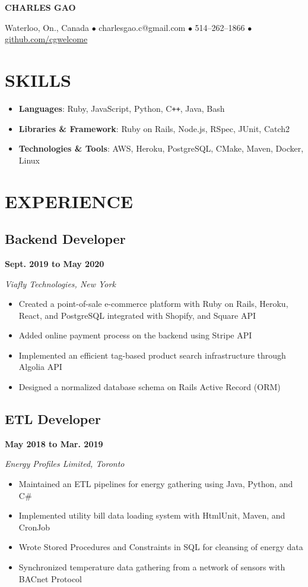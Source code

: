 \documentclass[12pt]{extarticle}
\begin{document}
\begin{center}
\textbf{\huge{CHARLES GAO}}

Waterloo, On., Canada
$\bullet$ charlesgao.c@gmail.com
$\bullet$ 514--262--1866
$\bullet$ \href{https://github.com/cgwelcome}{github.com/cgwelcome}
\end{center}

\section*{SKILLS}
\begin{itemize}
  \item \textbf{Languages}: Ruby, JavaScript, Python, C\texttt{++}, Java, Bash
  \item \textbf{Libraries \& Framework}: Ruby on Rails, Node.js, RSpec, JUnit, Catch2
  \item \textbf{Technologies \& Tools}: AWS, Heroku, PostgreSQL, CMake, Maven, Docker, Linux
\end{itemize}

\section*{EXPERIENCE}
\subsection*{Backend Developer} \hfill \textbf{Sept. 2019 to May 2020}

\textit{Viafly Technologies, New York}
\begin{itemize}
  \item Created a point-of-sale e-commerce platform with Ruby on Rails, Heroku, React, and PostgreSQL integrated with Shopify, and Square API
  \item Added online payment process on the backend using Stripe API
  \item Implemented an efficient tag-based product search infrastructure through Algolia API
  \item Designed a normalized database schema on Rails Active Record (ORM)
\end{itemize}

\subsection*{ETL Developer} \hfill \textbf{May 2018 to Mar. 2019}

\textsl{Energy Profiles Limited, Toronto}
\begin{itemize}
  \item Maintained an ETL pipelines for energy gathering using Java, Python, and C\#
  \item Implemented utility bill data loading system with HtmlUnit, Maven, and CronJob
  \item Wrote Stored Procedures and Constraints in SQL for cleansing of energy data
  \item Synchronized temperature data gathering from a network of sensors with BACnet Protocol
\end{itemize}
\end{document}
